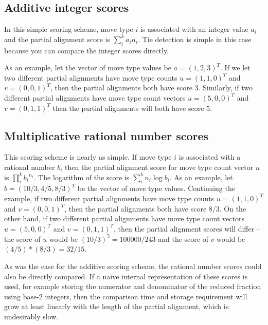 \documentclass{article}
\begin{document}
\subsection*{Additive integer scores}

In this simple scoring scheme,
move type $i$ is associated with an integer value $a_i$
and the partial alignment score is $\sum_i^k a_i n_i$.
Tie detection is simple in this case
because you can compare the integer scores directly.

As an example, let the vector of move type values be
$a = (1, 2, 3)^T$.
If we let two different partial alignments have move type counts
$u = (1, 1, 0)^T$ and $v = (0, 0, 1)^T$,
then the partial alignments both have score $3$.
Similarly, if two different partial alignments have move type count vectors
$u = (5, 0, 0)^T$ and $v = (0, 1, 1)^T$
then the partial alignments will both have score $5$.

\subsection*{Multiplicative rational number scores}

This scoring scheme is nearly as simple.
If move type $i$ is associated with a rational number $b_i$
then the partial alignment score for move type count vector $n$ is
$\prod_i^k {b_i}^{n_i}$.
The logarithm of the score is $\sum_i^k n_i \log{b_i}$.
As an example, let $b = (10/3, 4/5, 8/3)^T$
be the vector of move type values.
Continuing the example,
if two different partial alignments have move type counts
$u = (1, 1, 0)^T$ and $v = (0, 0, 1)^T$,
then the partial alignments both have score $8/3$.
On the other hand,
if two different partial alignments have move type count vectors
$u = (5, 0, 0)^T$ and $v = (0, 1, 1)^T$,
then the partial alignment scores will differ --
the score of $u$ would be $(10/3)^5 = 100000/243$
and the score of $v$ would be $(4/5)*(8/3) = 32/15$.

As was the case for the additive scoring scheme,
the rational number scores could also be directly compared.
If a naive internal representation of these scores is used,
for example storing the numerator and denominator of the reduced
fraction using base-2 integers, then the comparison time
and storage requirement will grow at least linearly with the
length of the partial alignment, which is undesirably slow.
\end{document}
